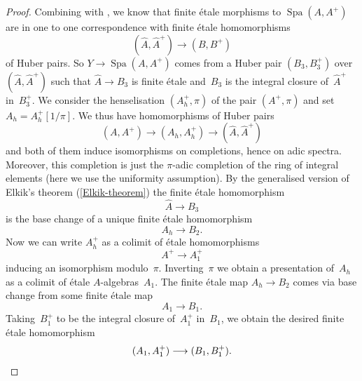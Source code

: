 \documentclass[a4paper,twoside,11pt,reqno]{amsart}
\DeclareMathOperator{\Spa}{Spa}
\theoremstyle{definition}
\numberwithin{equation}{subsection}
\begin{document}
\begin{proof}
    Combining \cite[1.4.4]{HuberBook} with \cite[Corollary~1.7.3(iii)]{HuberBook}, we know that finite étale morphisms to $\Spa(A,A^+)$ are in one to one correspondence with finite étale homomorphisms
    \[
     (\widehat{A},\widehat{A}^+) \longrightarrow (B,B^+)
    \]
    of Huber pairs.
    So $Y \to \Spa(A,A^+)$ comes from a Huber pair $(B_3,B_3^+)$ over $(\widehat{A},\widehat{A}^+)$ such that $\widehat{A} \to B_3$ is finite étale and~$B_3$ is the integral closure of~$\widehat{A}^+$ in~$B_3^+$.
    We consider the henselisation $(A^+_h,\pi)$ of the pair $(A^+,\pi)$ and set $A_h=A^+_h[1/\pi]$.
    We thus have homomorphisms of Huber pairs
    \[
     (A,A^+) \longrightarrow (A_h,A^+_h) \longrightarrow (\widehat{A},\widehat{A}^+) 
    \]
    and both of them induce isomorphisms on completions, hence on adic spectra.
    Moreover, this completion is just the $\pi$-adic completion of the ring of integral elements (here we use the uniformity assumption).
    By the generalised version of Elkik's theorem (\cref{Elkik-theorem}) the finite \'etale homomorphism
    \[
     \widehat{A} \longrightarrow B_3
    \]
    is the base change of a unique finite \'etale homomorphism
    \[
     A_h \longrightarrow B_2.
    \]
    Now we can write $A^+_h$ as a colimit of étale homomorphisms
    \[
     A^+ \longrightarrow A_1^+
    \]
    inducing an isomorphism modulo~$\pi$.
    Inverting~$\pi$ we obtain a presentation of~$A_h$ as a colimit of \'etale $A$-algebras~$A_1$.
    The finite \'etale map $A_h \to B_2$ comes via base change from some finite \'etale map
    \[
     A_1 \longrightarrow B_1.
    \]
    Taking~$B_1^+$ to be the integral closure of~$A_1^+$ in~$B_1$, we obtain the desired finite \'etale homomorphism
    \[
     (A_1,A_1^+) \longrightarrow (B_1,B_1^+). \qedhere
    \]
\end{proof}
\end{document}

